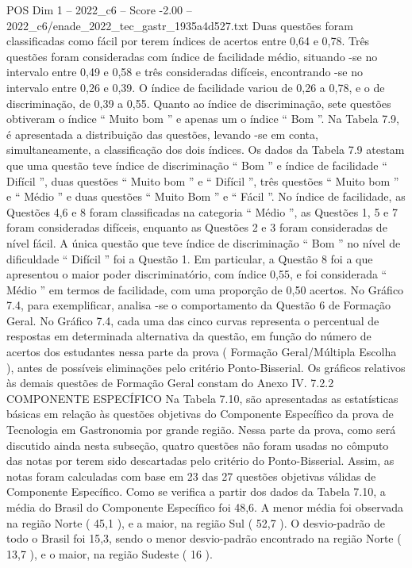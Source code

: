 \begin{textsample}{POS Dim 1 – 2022\_c6 – Score -2.00 – 2022\_c6/enade\_2022\_tec\_gastr\_1935a4d527.txt}
Duas questões foram classificadas como fácil por terem índices de acertos entre 0,64 e 0,78.
Três questões foram consideradas com índice de facilidade médio, situando -se no intervalo entre 0,49 e 0,58 e três consideradas difíceis, encontrando -se no intervalo entre 0,26 e 0,39.
O índice de facilidade variou de 0,26 a 0,78, e o de discriminação, de 0,39 a 0,55.
Quanto ao índice de discriminação, sete questões obtiveram o índice “ Muito bom ” e apenas um o índice “ Bom ”.
Na Tabela 7.9, é apresentada a distribuição das questões, levando -se em conta, simultaneamente, a classificação dos dois índices.
Os dados da Tabela 7.9 atestam que uma questão teve índice de discriminação “ Bom ” e índice de facilidade “ Difícil ”, duas questões “ Muito bom ” e “ Difícil ”, três questões “ Muito bom ” e “ Médio ” e duas questões “ Muito Bom ” e “ Fácil ”.
No índice de facilidade, as Questões 4,6 e 8 foram classificadas na categoria “ Médio ”, as Questões 1, 5 e 7 foram consideradas difíceis, enquanto as Questões 2 e 3 foram consideradas de nível fácil.
A única questão que teve índice de discriminação “ Bom ” no nível de dificuldade “ Difícil ” foi a Questão 1.
Em particular, a Questão 8 foi a que apresentou o maior poder discriminatório, com índice 0,55, e foi considerada “ Médio ” em termos de facilidade, com uma proporção de 0,50 acertos.
No Gráfico 7.4, para exemplificar, analisa -se o comportamento da Questão 6 de Formação Geral.
No Gráfico 7.4, cada uma das cinco curvas representa o percentual de respostas em determinada alternativa da questão, em função do número de acertos dos estudantes nessa parte da prova ( Formação Geral/Múltipla Escolha ), antes de possíveis eliminações pelo critério Ponto-Bisserial.
Os gráficos relativos às demais questões de Formação Geral constam do Anexo IV. 7.2.2 COMPONENTE ESPECÍFICO Na Tabela 7.10, são apresentadas as estatísticas básicas em relação às questões objetivas do Componente Específico da prova de Tecnologia em Gastronomia por grande região.
Nessa parte da prova, como será discutido ainda nesta subseção, quatro questões não foram usadas no cômputo das notas por terem sido descartadas pelo critério do Ponto-Bisserial.
Assim, as notas foram calculadas com base em 23 das 27 questões objetivas válidas de Componente Específico.
Como se verifica a partir dos dados da Tabela 7.10, a média do Brasil do Componente Específico foi 48,6.
A menor média foi observada na região Norte ( 45,1 ), e a maior, na região Sul ( 52,7 ).
O desvio-padrão de todo o Brasil foi 15,3, sendo o menor desvio-padrão encontrado na região Norte ( 13,7 ), e o maior, na região Sudeste ( 16 ).

\end{textsample}
